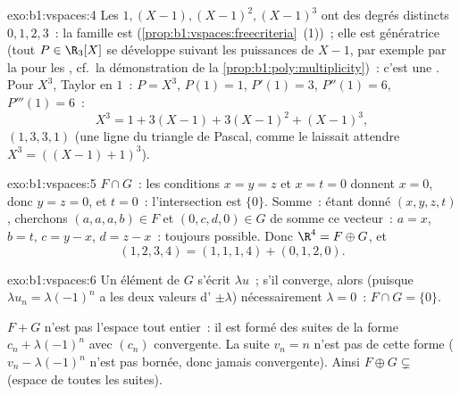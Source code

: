 \begin{solution}{exo:b1:vspaces:4}
Les  $1, (X-1), (X-1)^2, (X-1)^3$ ont des degrés distincts
$0, 1, 2, 3$~: la famille est 
(\cref{prop:b1:vspaces:freecriteria}~(1))~; elle est génératrice (tout
$P \in \R_3[X]$ se développe suivant les puissances de $X - 1$, par
exemple par la  pour les , cf.\ la
démonstration de la \cref{prop:b1:poly:multiplicity})~: c'est une .
Pour $X^3$, Taylor en $1$~: $P = X^3$, $P(1) = 1$, $P'(1) = 3$,
$P''(1) = 6$, $P'''(1) = 6$~:
\[
X^3 = 1 + 3(X - 1) + 3(X-1)^2 + (X-1)^3 ,
\]
 $(1, 3, 3, 1)$ (une ligne du triangle de Pascal, comme le
laissait attendre $X^3 = ((X-1)+1)^3$).
\end{solution}

\begin{solution}{exo:b1:vspaces:5}
$F \cap G$~: les conditions $x = y = z$ et $x = t = 0$ donnent 
$x = 0$, donc $y = z = 0$, et $t = 0$~: l'intersection est
$\{0\}$. Somme~: étant donné $(x,y,z,t)$, cherchons $(a,a,a,b) \in F$ et
$(0,c,d,0) \in G$ de somme ce vecteur~: $a = x$, $b = t$, $c = y - x$,
$d = z - x$~: toujours possible. Donc $\R^4 = F \oplus G$, et
\[
(1,2,3,4) = (1,1,1,4) + (0,1,2,0) .
\]
\end{solution}

\begin{solution}{exo:b1:vspaces:6}
Un élément de $G$ s'écrit $\lambda u$~; s'il converge, alors (puisque
$\lambda u_n = \lambda(-1)^n$ a les deux valeurs d' $\pm
\lambda$) nécessairement $\lambda = 0$~: $F \cap G = \{0\}$.

$F + G$ n'est pas l'espace tout entier~: il est formé des suites de la
forme $c_n + \lambda(-1)^n$ avec $(c_n)$ convergente. La suite $v_n =
n$ n'est pas de cette forme ($v_n - \lambda(-1)^n$ n'est pas bornée,
donc jamais convergente). Ainsi $F \oplus G \subsetneq$ (espace de
toutes les suites).
\end{solution}

